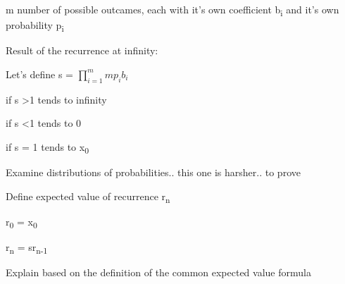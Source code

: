 \documentclass[12pt,reqno]{amsart}
\begin{document}
m number of possible outcames, each with it's own coefficient b\textsubscript{i} and it's own probability p\textsubscript{i}

Result of the recurrence at infinity:

Let's define s = $\prod_{i=1}^{m} mp_{i}b_{i}$



if s \textgreater 1 tends to infinity

if s \textless 1 tends to 0

if s = 1 tends to x\textsubscript{0}



Examine distributions of probabilities.. this one is harsher.. to prove



Define expected value of recurrence r\textsubscript{n}

r\textsubscript{0} = x\textsubscript{0}

r\textsubscript{n} = sr\textsubscript{n-1}

Explain based on the definition of the common expected value formula
\end{document}
